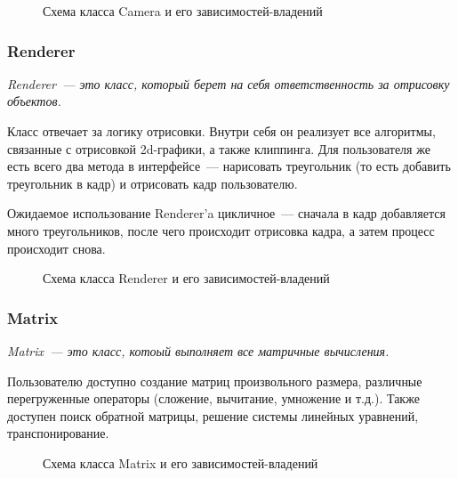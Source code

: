 \documentclass{article}
\begin{document}
\begin{center}
\begin{figure}[H]
\caption{Схема класса Camera и его зависимостей-владений}
\label{ris:image}
\end{figure}
\end{center}
\newpage
\subsubsection{Renderer}

\textit{Renderer~--- это класс, который берет на себя ответственность за отрисовку объектов.}
\medskip

Класс отвечает за логику отрисовки. Внутри себя он реализует все алгоритмы, связанные с отрисовкой 2d-графики, а также клиппинга. Для пользователя же есть всего два метода в интерфейсе~--- нарисовать треугольник (то есть добавить треугольник в кадр) и отрисовать кадр пользователю.

Ожидаемое использование Renderer'a цикличное~--- сначала в кадр добавляется много треугольников, после чего происходит отрисовка кадра, а затем процесс происходит снова.

\begin{center}
\begin{figure}[H]
\caption{Схема класса Renderer и его зависимостей-владений}
\label{ris:image}
\end{figure}
\end{center}

\newpage
\subsubsection{Matrix}

\textit{Matrix~--- это класс, котоый выполняет все матричные вычисления.}
\medskip

Пользователю доступно создание матриц произвольного размера, различные перегруженные операторы (сложение, вычитание, умножение и т.д.). Также доступен поиск обратной матрицы, решение системы линейных уравнений, транспонирование.

\begin{center}
\begin{figure}[H]
\caption{Схема класса Matrix и его зависимостей-владений}
\label{ris:image}
\end{figure}
\end{center}
\end{document}
